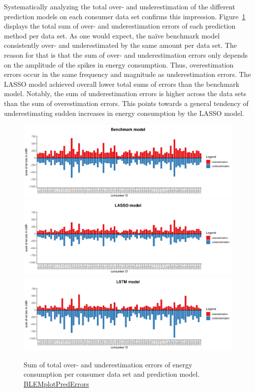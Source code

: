 Systematically analyzing the total over- and underestimation of the different prediction models on each consumer data set confirms this impression. Figure~\ref{Fig:overunderestimation} displays the total sum of over- and underestimation errors of each prediction method per data set. As one would expect, the na\"ive benchmark model consistently over- and underestimated by the same amount per data set. The reason for that is that the sum of over- and underestimation errors only depends on the amplitude of the spikes in energy consumption. Thus, overestimation errors occur in the same frequency and magnitude as underestimation errors. The LASSO model achieved overall lower total sums of errors than the benchmark model. Notably, the sum of underestimation errors is higher across the data sets than the sum of overestimation errors. This points towards a general tendency of underestimating sudden increases in energy consumption by the LASSO model.
%
\begin{figure}[htbp]
    \centering
    \includegraphics[width=\textwidth]{thesis/graphs/evaluation/c_barplot_naive_overunderestimation.pdf}\\\vspace{.6cm}
    \includegraphics[width=\textwidth]{thesis/graphs/evaluation/c_barplot_LASSO_overunderestimation.pdf}\\\vspace{.6cm}
    \includegraphics[width=\textwidth]{thesis/graphs/evaluation/c_barplot_LSTM_overunderestimation.pdf}
    \caption[Sum of total over- and underestimation errors per consumer data set]{Sum of total over- and underestimation errors of energy consumption per consumer data set and prediction model. \quantnet\href{https://github.com/QuantLet/BLEM/tree/master/BLEMplotPredErrors}{BLEMplotPredErrors}}
    \label{Fig:overunderestimation}
\end{figure}
